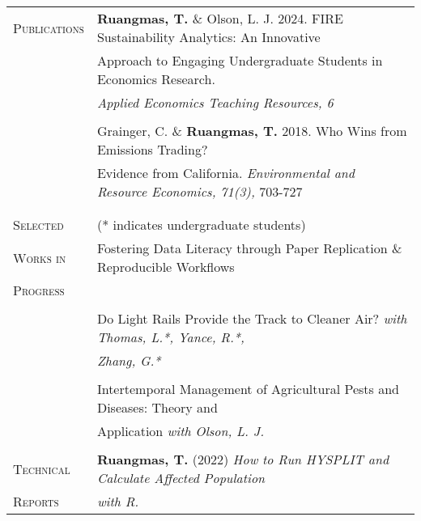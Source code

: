 \documentclass[letterpaper,11pt,oneside]{article}\usepackage[]{graphicx}\usepackage[]{xcolor}
\begin{document}
\noindent \begin{tabular}{p{1.2in} l}
\textsc{Publications}   & \textbf{Ruangmas, T.} \& Olson, L. J. 2024. FIRE Sustainability Analytics: An Innovative \\
				                & Approach to Engaging Undergraduate Students in Economics Research. \\
				                & \textit{Applied Economics Teaching Resources, 6} \href{https://www.aetrjournal.org/advance-access/special-issue-on-undergraduate-research-in-agricultural-and-applied-economics/fire-sustainability-analytics-an-innovative-approach-to-engaging-undergraduate-students-in-economics-research}{\color{blue}{[LINK]}} \\
	                      & \\  
                        & Grainger, C. \& \textbf{Ruangmas, T.} 2018. Who Wins from Emissions Trading? \\
				                & Evidence from California. \textit{Environmental and Resource Economics, 71(3),} 703-727 \\
				                & \href{https://doi.org/10.1007/s10640-017-0180-1}{\color{blue}{https://doi.org/10.1007/s10640-017-0180-1}} \\
				                & \\   
\textsc{Selected} & (* indicates undergraduate students) \\
\textsc{Works in} & Fostering Data Literacy through Paper Replication \& Reproducible Workflows \\
\textsc{Progress} & \href{https://drive.google.com/file/d/1fRY17-CxsH2L_wNmxx7SN8mxS3uf7Bmg/view?usp=drive_link}{\color{blue}{[LINK]}} \\
	                & \\
	                & Do Light Rails Provide the Track to Cleaner Air? \textit{with Thomas, L.*, Yance, R.*,} \\
	                & \textit{Zhang, G.*} \\
	                & \\	                
                	& Intertemporal Management of Agricultural Pests and Diseases: Theory and \\			
                  & Application \textit{with Olson, L. J.}\\
                  & \\
\textsc{Technical} & \textbf{Ruangmas, T.} (2022) \textit{How to Run HYSPLIT and Calculate Affected Population} \\
\textsc{Reports}   & \textit{with R.} \href{https://ruangmas.github.io/hysplit.html}{\color{blue}{[LINK]}} \\

\end{tabular}
\end{document}

